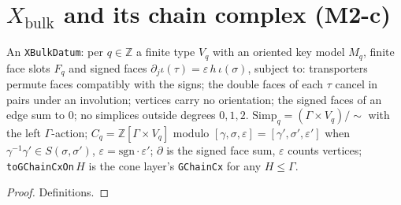 \section{\texorpdfstring{$X_{\mathrm{bulk}}$}{X\_bulk} and its chain complex (M2-c)}

\begin{definition}\label{def:xbulk}
  \leanok
  An \texttt{XBulkDatum}: per $q\in\mathbb Z$ a finite type $V_q$ with an oriented key model $M_q$, finite face slots $F_q$ and
  signed faces $\partial_j\iota(\tau)=\varepsilon\,h\,\iota(\sigma)$, subject to: transporters permute faces compatibly with the
  signs; the double faces of each $\tau$ cancel in pairs under an involution; vertices carry no orientation; the signed faces of
  an edge sum to $0$; no simplices outside degrees $0,1,2$. $\mathrm{Simp}_q=(\Gamma\times V_q)/\!\sim$ with the left
  $\Gamma$-action; $C_q=\mathbb Z[\Gamma\times V_q]$ modulo $[\gamma,\sigma,\varepsilon]=[\gamma',\sigma',\varepsilon']$ when
  $\gamma^{-1}\gamma'\in S(\sigma,\sigma')$, $\varepsilon=\mathrm{sgn}\cdot\varepsilon'$; $\partial$ is the signed face sum,
  $\varepsilon$ counts vertices; \texttt{toGChainCxOn}\,$H$ is the cone layer's \texttt{GChainCx} for any $H\le\Gamma$.
\end{definition}
\begin{proof}
  \leanok
  Definitions.
\end{proof}

